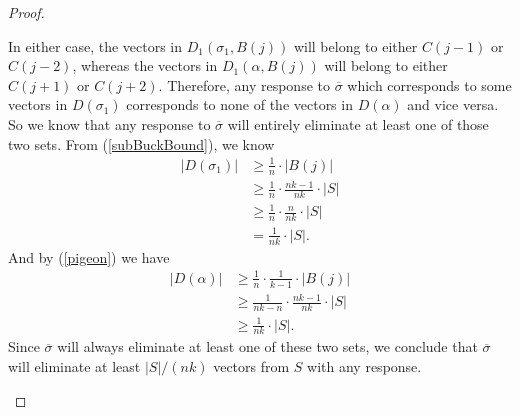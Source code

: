 \documentclass[12pt, a4paper]{article}
\begin{document}
\begin{proof}
\begin{enumerate}[label=\roman*.]
		In either case, the vectors in $D_1(\sigma_1,B(j))$ will belong to either $C(j-1)$ or $C(j-2)$, whereas the vectors in $D_1(\alpha, B(j))$ will belong to either $C(j+1)$ or $C(j+2)$. 
		Therefore, any response to $\overline{\sigma}$ which
		corresponds to some vectors in $D(\sigma_1)$ corresponds to none
		of the vectors in $D(\alpha)$ and vice versa. So we know that any
		response to $\overline{\sigma}$ will entirely eliminate at least one
		of those two sets. From (\ref{subBuckBound}), we know
		\begin{align*}
		|D(\sigma_1)| & \ge \frac{1}{n}\cdot|B(j)|\\
		& \ge \frac{1}{n}\cdot\frac{nk-1}{nk}\cdot|S|\\
		& \ge \frac{1}{n}\cdot\frac{n}{nk}\cdot|S|\\
		& = \frac{1}{nk}\cdot|S|.
		\end{align*}
		And by (\ref{pigeon}) we have
		\begin{align*}
		|D(\alpha)| & \ge\frac{1}{n}\cdot\frac{1}{k-1}\cdot|B(j)|\\
		& \ge \frac{1}{nk-n}\cdot\frac{nk-1}{nk}\cdot|S|\\
		& \ge \frac{1}{nk}\cdot|S|.
		\end{align*}
		Since $\overline{\sigma}$ will always eliminate at least one of
		these two sets, we conclude that $\overline{\sigma}$ will eliminate
		at least $|S|/(nk)$ vectors from $S$ with any response.
		

\end{enumerate}
\end{proof}
\end{document}
